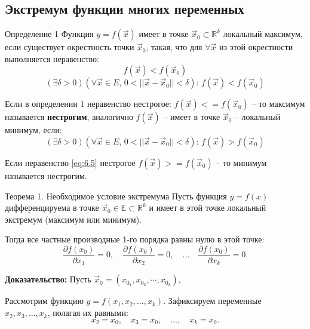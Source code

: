 \subsection{Экстремум функции многих переменных}

\begin{tbox}{Определение 1}
	Функция $y = f(\vec{x})$ имеет в точке $\vec{x}_0 \subset \mathbb{R}^k$ локальный максимум, если существует окрестность точки $\vec{x}_0$, такая, что для $\forall \vec{x}$ из этой окрестности выполняется неравенство:
	\begin{equation*}
		f(\vec{x}) < f(\vec{x}_0)
	\end{equation*}
	\begin{equation}\label{eq:6.4}
		(\exists \delta > 0)(\forall \vec{x} \in E, \, 0 < ||\vec{x} - \vec{x}_0|| < \delta): \, f(\vec{x}) < f(\vec{x}_0)
	\end{equation}
\end{tbox}

Если в определении 1 неравенство нестрогое: $f(\vec{x}) <= f(\vec{x}_0)$ -- то максимум называется \textbf{нестрогим}, аналогично $f(\vec{x})$ -- имеет в точке $\vec{x}_0$ -- локальный минимум, если:
\begin{equation} \label{eq:6.5}
	(\exists \delta > 0)(\forall \vec{x} \in E, \, 0 < ||\vec{x} - \vec{x}_0|| < \delta): \, f(\vec{x}) > f(\vec{x}_0)
\end{equation}

Если неравенство \cref{eq:6.5} нестрогое $f(\vec{x}) >= f(\vec{x}_0)$ -- то минимум называется нестрогим.

\begin{tbox}{Теорема 1. Необходимое условие экстремума}
	Пусть функция \( y = f(x) \) дифференцируема в точке \( \vec{x}_0 \in \mathbb{E} \subset \mathbb{R}^k \) и имеет в этой точке локальный экстремум (максимум или минимум).

	Тогда все частные производные 1-го порядка равны нулю в этой точке:
	\begin{equation*}
		\frac{\partial f(x_0)}{\partial x_1} = 0, \quad \frac{\partial f(x_0)}{\partial x_2} = 0, \quad \dots \quad \frac{\partial f(x_0)}{\partial x_k} = 0.
	\end{equation*}

	\textbf{Доказательство: } Пусть $\vec{x}_0 = (x_{0_1}, x_{0_2}, \cdots, x_{0_k})$,
\end{tbox}

Рассмотрим функцию \( y = f(x_1, x_2, \dots, x_k) \). Зафиксируем переменные \( x_2, x_3, \dots, x_k \), полагая их равными:
\begin{equation}
	x_2 = x_0, \quad x_3 = x_0, \quad \dots, \quad x_k = x_0.
\end{equation}

